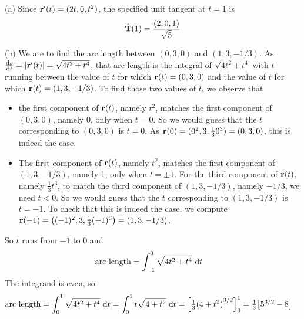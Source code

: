 \begin{solution} (a)
Since $\mathbf{r}'(t) = (2t,0,t^2)$, the specified unit tangent at $t=1$ is
\begin{equation*}
\hat{\mathbf{T}}(1) = \frac{(2,0,1)}{\sqrt{5}}
\end{equation*}

\noindent (b)
We are to find the arc length between $(0,3,0)$ and $(1,3,-1/3)$.
As $\diff{s}{t}=|\vr'(t)|=\sqrt{4t^2+t^4}$, that arc length is the integral of
$\sqrt{4t^2+t^4}$ with $t$ running between the value of $t$ for which
$\mathbf{r}(t)=(0,3,0)$ and the value of $t$ for which $\mathbf{r}(t)=(1,3,-1/3)$.
To find those two values of $t$, we observe that
\begin{itemize}
\item
the first component of $\mathbf{r}(t)$, namely $t^2$, matches the first component
of $(0,3,0)$, namely $0$,  only when $t=0$. So we would guess that the $t$ 
corresponding to $(0,3,0)$ is $t=0$.
As $\mathbf{r}(0) = (0^2,3,\frac{1}{3}0^3)=(0,3,0)$, this is indeed the case.
\item   
The first component of $\mathbf{r}(t)$, namely $t^2$, matches the first component
of $(1,3,-1/3)$, namely 1, only when $t=\pm 1$. For the third component of $\mathbf{r}(t)$, namely $\frac{1}{3}t^3$, to match the third component
of $(1,3,-1/3)$, namely $-1/3$, we need $t<0$.  So we would guess that the $t$ 
corresponding to $(1,3,-1/3)$ is $t=-1$.
To check that this is indeed the case, we compute $\mathbf{r}(-1) = \big((-1)^2,3,\frac{1}{3}(-1)^3\big)=(1,3,-1/3)$.
\end{itemize}
So $t$ runs  from $-1$ to $0$ and
\begin{align*}
\text{arc length} &= \int_{-1}^0 \sqrt{4t^2+t^4}\ \mathrm{d}t
\end{align*}
The integrand is even, so
\begin{align*}
\text{arc length} &= \int_0^1 \sqrt{4t^2+t^4}\ \mathrm{d}t
=\int_0^1 t\sqrt{4+t^2}\ \mathrm{d}t
=\Big[\tfrac{1}{3}{(4+t^2)}^{3/2}\Big]_0^1
=\tfrac{1}{3}\big[5^{3/2}-8\big]
\end{align*}

\end{solution}



